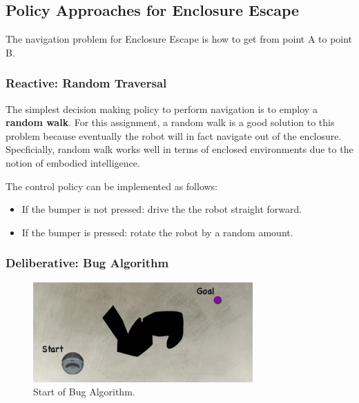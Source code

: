 \begin{itemize}

\end{itemize}

\subsection{Policy Approaches for Enclosure Escape}

The navigation problem for Enclosure Escape is how to get from point A to point B. 

\subsubsection{Reactive: Random Traversal}

The simplest decision making policy to perform navigation is to employ a {\bf random walk}. For this assignment, a random walk is a good solution to this problem because eventually the robot will in fact navigate out of the enclosure. Specficially, random walk works well in terms of enclosed environments due to the notion of embodied intelligence. 

\vspace{5 mm}
\noindent The control policy can be implemented as follows: 
\begin{itemize}
\item If the bumper is not pressed: drive the the robot straight forward.
\item If the bumper is pressed: rotate the robot by a random amount.
\end{itemize}

\subsubsection{Deliberative: Bug Algorithm}

\begin{figure}[!h]
\centering
\includegraphics[width=0.75\textwidth]{figures/5_bug1.jpg}
\caption{Start of Bug Algorithm.}
\label{fig:5_bug1}
\end{figure}

